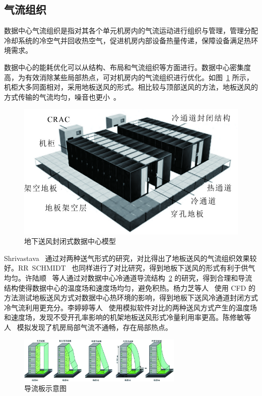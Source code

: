 \subsection{气流组织}
数据中心气流组织是指对其各个单元机房内的气流运动进行组织与管理，管理分配冷却系统的冷空气并回收热空气，促进机房内部设备热量传递，保障设备满足热环境需求。

数据中心的能耗优化可以从结构、布局和气流组织等方面进行。数据中心密集度高，为有效消除某些局部热点，可对机房内的气流组织进行优化。如图~\ref{F:1} 所示，机柜大多同面相对，采用地板送风的形式。相比较与顶部送风的方法，地板送风的方式传输的气流均匀，噪音也更小~\cite{8}。

\begin{figure}[htbp]
	\centering
	\includegraphics[width=\textwidth]{figure/figure_1.jpg}
	\caption{地下送风封闭式数据中心模型}
	\label{F:1}
\end{figure}

Shrivastava~\cite{9} 通过对两种送气形式的研究，对比得出了地板送风的气流组织效果较好。RR~SCHMIDT~\cite{10} 也同样进行了对比研究，得到地板下送风的形式有利于供气均匀。许陆顺~\cite{11} 等人通过对数据中心冷通道导流结构~\ref{F:2} 的研究，得到合理和导流结构使得数据中心的温度场和速度场均匀，避免积热。杨力芝等人~\cite{12} 使用 CFD 的方法测试地板送风方式对数据中心热环境的影响，得到地板下送风冷通道封闭方式冷气流利用更充分。李婷婷等人~\cite{13} 使用模拟软件对比的两种送风方式产生的温度场和速度场，发现不受开孔率影响的机架地板送风形式冷量利用率更高。陈修敏等人~\cite{14} 模拟发现了机房局部气流不通畅，存在局部热点。

\begin{figure}[htbp]
	\centering
	\includegraphics[width=0.7\textwidth]{figure/figure_2.jpg}
	\caption{导流板示意图}
	\label{F:2}
\end{figure}

